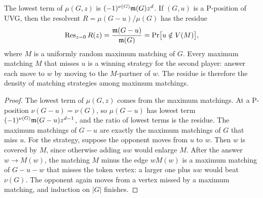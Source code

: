 \begin{proposition}\label{prop:residue}
The lowest term of $\mu(G,z)$ is $(-1)^{\nu(G)}\mathfrak{m}(G)z^d$. If $(G,u)$ is a P-position of UVG, then the resolvent $R=\mu(G-u)/\mu(G)$ has the residue
\[
\operatorname{Res}_{z=0}R(z)=\frac{\mathfrak{m}(G-u)}{\mathfrak{m}(G)}=\Pr\bigl[u\notin V(M)\bigr],
\]
where $M$ is a uniformly random maximum matching of $G$.
Every maximum matching $M$ that misses $u$ is a winning strategy for the second player: answer each move to $w$ by moving to the $M$-partner of $w$. The residue is therefore the density of matching strategies among maximum matchings.
\end{proposition}
\begin{proof}
The lowest term of $\mu(G,z)$ comes from the maximum matchings. At a P-position $\nu(G-u)=\nu(G)$, so $\mu(G-u)$ has lowest term $(-1)^{\nu(G)}\mathfrak{m}(G-u)z^{d-1}$, and the ratio of lowest terms is the residue. The maximum matchings of $G-u$ are exactly the maximum matchings of $G$ that miss $u$. For the strategy, suppose the opponent moves from $u$ to $w$. Then $w$ is covered by $M$, since otherwise adding $uw$ would enlarge $M$. After the answer $w\to M(w)$, the matching $M$ minus the edge $wM(w)$ is a maximum matching of $G-u-w$ that misses the token vertex: a larger one plus $uw$ would beat $\nu(G)$. The opponent again moves from a vertex missed by a maximum matching, and induction on $|G|$ finishes.
\end{proof}

